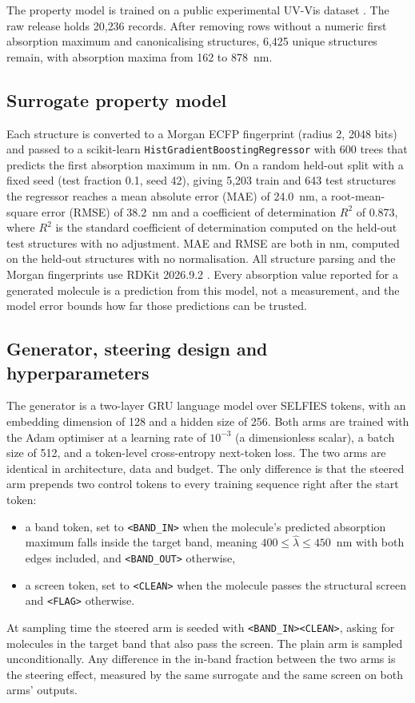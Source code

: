 \documentclass[11pt]{article}
\begin{document}
The property model is trained on a public experimental UV-Vis dataset
\cite{joung2020uvvis}. The raw release holds 20{,}236 records. After removing rows without
a numeric first absorption maximum and canonicalising structures, 6{,}425 unique
structures remain, with absorption maxima from 162 to 878~nm.

\subsection{Surrogate property model}

Each structure is converted to a Morgan ECFP fingerprint (radius 2, 2048 bits) and passed
to a scikit-learn \texttt{HistGradientBoostingRegressor} \cite{pedregosa2011scikit} with
600 trees that predicts the first absorption maximum in nm. On a random held-out split with a fixed seed (test fraction 0.1, seed 42), giving 5{,}203 train and
643 test structures the regressor reaches a mean absolute error (MAE) of
24.0~nm, a root-mean-square error (RMSE) of 38.2~nm and a coefficient of determination
$R^2$ of 0.873, where $R^2$ is the standard coefficient of determination computed on
the held-out test structures with no adjustment. MAE and RMSE are both in nm,
computed on the held-out structures with no normalisation. All structure parsing and
the Morgan fingerprints use RDKit 2026.9.2 \cite{rdkit}. Every absorption value reported for a generated molecule is a prediction
from this model, not a measurement, and the model error bounds how far those predictions
can be trusted.

\subsection{Generator, steering design and hyperparameters}

The generator is a two-layer GRU language model over SELFIES tokens, with an embedding
dimension of 128 and a hidden size of 256. Both arms are trained with the Adam optimiser
at a learning rate of $10^{-3}$ (a dimensionless scalar), a batch size of 512, and a token-level cross-entropy
next-token loss. The two arms are identical in architecture, data and budget. The only
difference is that the steered arm prepends two control tokens to every training sequence
right after the start token:
\begin{itemize}
  \item a band token, set to \texttt{<BAND\_IN>} when the molecule's predicted absorption
  maximum falls inside the target band, meaning $400 \le \hat{\lambda} \le 450$~nm with both
  edges included, and \texttt{<BAND\_OUT>} otherwise,
  \item a screen token, set to \texttt{<CLEAN>} when the molecule passes the structural
  screen and \texttt{<FLAG>} otherwise.
\end{itemize}
At sampling time the steered arm is seeded with \texttt{<BAND\_IN><CLEAN>}, asking for
molecules in the target band that also pass the screen. The plain arm is sampled
unconditionally. Any difference in the in-band fraction between the two arms is the
steering effect, measured by the same surrogate and the same screen on both arms' outputs.
\end{document}
